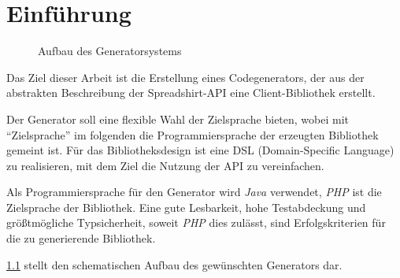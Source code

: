  \chapter{Einführung}
\label{chap:introduction}


\begin{figure}[b]
    \centering
    \resizebox{\textwidth}{!}{
        
    }
    \caption{Aufbau des Generatorsystems}
    \label{fig:generatorstructure}
\end{figure}        

Das Ziel dieser Arbeit ist die Erstellung eines Codegenerators, der aus der abstrakten Beschreibung der Spreadshirt-API eine Client-Bibliothek erstellt.

Der Generator soll eine flexible Wahl der Zielsprache bieten, wobei mit \enquote{Zielsprache} im folgenden die Programmiersprache der erzeugten Bibliothek gemeint ist. 
Für das Bibliotheksdesign ist eine \gls{DSL} (Domain-Specific Language) zu realisieren, mit dem Ziel die Nutzung der \gls{API} zu vereinfachen. 

Als Programmiersprache für den Generator wird \emph{Java} verwendet, \emph{PHP} ist die Zielsprache der Bibliothek.
Eine gute Lesbarkeit, hohe Testabdeckung und größtmögliche Typsicherheit, soweit \emph{PHP} dies zulässt, sind Erfolgskriterien für die zu generierende Bibliothek.

\cref{fig:generatorstructure} stellt den schematischen Aufbau des gewünschten Generators dar.



